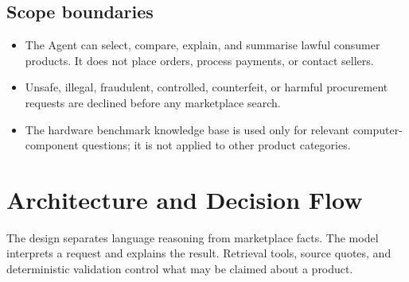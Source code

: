 \documentclass[11pt,letterpaper]{article}
\begin{document}
\subsection{Scope boundaries}
\begin{itemize}
  \item The Agent can select, compare, explain, and summarise lawful consumer products. It does not place orders, process payments, or contact sellers.
  \item Unsafe, illegal, fraudulent, controlled, counterfeit, or harmful procurement requests are declined before any marketplace search.
  \item The hardware benchmark knowledge base is used only for relevant computer-component questions; it is not applied to other product categories.
\end{itemize}

\section{Architecture and Decision Flow}

The design separates language reasoning from marketplace facts. The model interprets a request and explains the result. Retrieval tools, source quotes, and deterministic validation control what may be claimed about a product.
\end{document}
